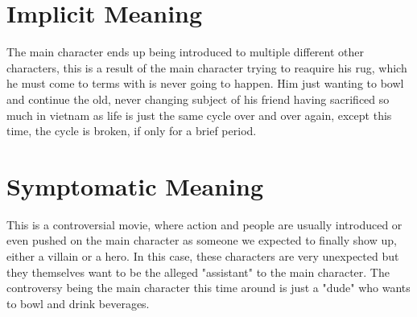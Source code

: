 \documentclass{article}
\begin{document}
\section*{Implicit Meaning}
The main character ends up being introduced to multiple different other characters, this is a result of the main character trying to reaquire his rug, which he must come to terms with is never going to happen. Him just wanting to bowl and continue the old, never changing subject of his friend having sacrificed so much in vietnam as life is just the same cycle over and over again, except this time, the cycle is broken, if only for a brief period.


\section*{Symptomatic Meaning}
This is a controversial movie, where action and people are usually introduced or even pushed on the main character as someone we expected to finally show up, either a villain or a hero. In this case, these characters are very unexpected but they themselves want to be the alleged "assistant" to the main character. The controversy being the main character this time around is just a "dude" who wants to bowl and drink beverages.
\end{document}
